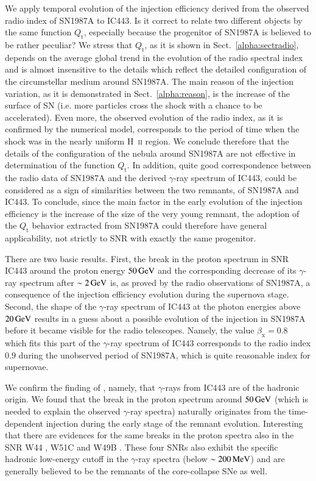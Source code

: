 \documentclass{aa}
\newcommand\un[1]{{\,\rm #1}}
\newcommand\rs[1]{_\mathrm{#1}}
\newcommand\g{$\gamma$}
\begin{document}
We apply temporal evolution of the injection efficiency derived from the observed radio index of SN1987A to IC443. Is it correct to relate two different objects by the same function $Q\rs{t}$, especially because the progenitor of SN1987A is believed to be rather peculiar? We stress that $Q\rs{t}$, as it is shown in Sect.~\ref{alpha:sectradio}, depends on the average global trend in the evolution of the radio spectral index and is almost insensitive to the details which reflect the detailed configuration of the circumstellar medium around SN1987A. The main reason of the injection variation, as it is demonstrated in Sect.~\ref{alpha:reason}, is the increase of the surface of SN (i.e.  more particles cross the shock with a chance to be accelerated). Even more, the observed evolution of the radio index, as it is confirmed by the numerical model, corresponds to the period of time when the shock was in the nearly uniform H~\textsc{ii} region. We conclude therefore that the details of the configuration of the nebula around SN1987A are not effective in determination of the function $Q\rs{t}$. In addition, quite good correspondence between the radio data of SN1987A and the derived \g-ray spectrum of IC443, could be considered as a sign of similarities between the two remnants, of SN1987A and IC443. To conclude, since the main factor in the early evolution of the injection efficiency is the increase of the size of the very young remnant, the adoption of the $Q\rs{t}$ behavior extracted from SN1987A could therefore have general applicability, not strictly to SNR with exactly the same progenitor.

There are two basic results. First, the break in the proton spectrum in SNR IC443 around the proton energy $50\un{GeV}$ and the corresponding decrease of its \g-ray spectrum after $\sim 2\un{GeV}$ is, as proved by the radio observations of SN1987A, a consequence of the injection efficiency evolution during the supernova stage. 
Second, the shape of the \g-ray spectrum of IC443 at the photon energies above $20\un{GeV}$ results in a guess about a possible evolution of the injection in SN1987A before it became visible for the radio telescopes. Namely, the value $\beta\rs{x}=0.8$ which fits this part of the \g-ray spectrum of IC443 corresponds to the radio index $0.9$ during the unobserved period of SN1987A, which is quite reasonable index for supernovae.

We confirm the finding of \citet{Ackermann-etal-2013}, namely, that \g-rays from IC443 are of the hadronic origin. 
We found that the break in the proton spectrum around $50\un{GeV}$ (which is needed to explain the observed \g-ray spectra) naturally originates from the time-dependent injection during the early stage of the remnant evolution. Interesting that there are evidences for the same breaks in the proton spectra also in the SNR W44 \citep{Ackermann-etal-2013}, W51C \citep{Abdo-etal-2009,Jogler-Funk-2016} and W49B \citep{Abdalla-etal-2016}. These four SNRs also exhibit the specific hadronic low-energy cutoff in the \g-ray spectra (below $\sim 200\un{MeV}$) and are generally believed to be the remnants of the core-collapse SNe as well. 
\end{document}
